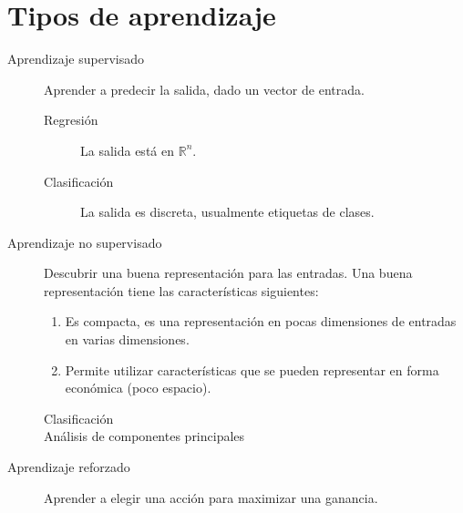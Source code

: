 \section{Tipos de aprendizaje}

\begin{description}
 \item [Aprendizaje supervisado] Aprender a predecir la salida, dado un vector de entrada.
 \begin{description}
  \item [Regresión] La salida está en $\mathbb{R}^n$.
  \item [Clasificación] La salida es discreta, usualmente etiquetas de clases.
 \end{description}
 
 \item [Aprendizaje no supervisado] Descubrir una buena representación para las entradas.  Una buena representación tiene las características siguientes:
 \begin{enumerate}
  \item Es compacta, es una representación en pocas dimensiones de entradas en varias dimensiones.
  \item Permite utilizar características que se pueden representar en forma económica (poco espacio).
 \end{enumerate}
 \begin{description}
  \item [Clasificación]
  \item [Análisis de componentes principales]
 \end{description}
 
 \item [Aprendizaje reforzado] Aprender a elegir una acción para maximizar una ganancia.
\end{description}